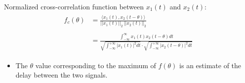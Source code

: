 \documentclass[12pt,a4paper]{article}
\begin{document}
 Normalized cross-correlation function between $x_{1}(t)$ and $x_{2}(t)$:
 \begin{align*}\begin{split}
 f_{c}(\theta) &= \frac{\langle x_{1}(t), x_{2}(t-\theta) \rangle}{ \lvert \lvert x_{1}(t) \rvert \rvert_{2} \ \lvert \lvert x_{2}(t) \rvert \rvert_{2}} \\\\
 &= \frac{\int_{-\infty}^{\infty}  x_{1}(t) x_{2}(t-\theta) dt}{\sqrt{\int_{-\infty}^{+\infty}\lvert x_{1}(t)
 \rvert^{2} dt} \cdot \sqrt{\int_{-\infty}^{+\infty}\lvert x_{2}(t-\theta) \rvert^{2} dt}}
 \end{split} \end{align*}
  \begin{itemize}
 \item The $\theta$ value corresponding to the maximum of $f(\theta)$ is an estimate of the delay between the two signals.
 \end{itemize}
\end{document}
